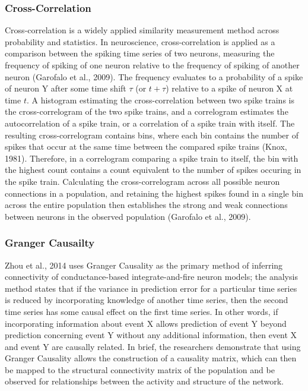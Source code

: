 \documentclass[11pt]{article}
\begin{document}
\subsubsection{Cross-Correlation}
Cross-correlation is a widely applied similarity measurement method across probability and statistics. In neuroscience, cross-correlation is applied as a comparison between the spiking time series of two neurons, measuring the frequency of spiking of one neuron relative to the frequency of spiking of another neuron (Garofalo et al., 2009). The frequency evaluates to a probability of a spike of neuron Y after some time shift $\tau$ (or $t + \tau$) relative to a spike of neuron X at time $t$. A histogram estimating the cross-correlation between two spike trains is the cross-correlogram of the two spike trains, and a correlogram estimates the autocorrelation of a spike train, or a correlation of a spike train with itself. The resulting cross-correlogram contains bins, where each bin contains the number of spikes that occur at the same time between the compared spike trains (Knox, 1981). Therefore, in a correlogram comparing a spike train to itself, the bin with the highest count contains a count equivalent to the number of spikes occuring in the spike train. Calculating the cross-correlogram across all possible neuron connections in a population, and retaining the highest spikes found in a single bin across the entire population then establishes the strong and weak connections between neurons in the observed population (Garofalo et al., 2009). 


\subsubsection{Granger Causailty}
Zhou et al., 2014 uses Granger Causality as the primary method of inferring connectivity of conductance-based integrate-and-fire neuron models; the analysis method states that if the variance in prediction error for a particular time series is reduced by incorporating knowledge of another time series, then the second time series has some causal effect on the first time series. In other words, if incorporating information about event X allows prediction of event Y beyond prediction concerning event Y without any additional information, then event X and event Y are causally related.  In brief, the researchers demonstrate that using Granger Causality allows the construction of a causality matrix, which can then be mapped to the structural connectivity matrix of the population and be observed for relationships between the activity and structure of the network.\par
\end{document}

